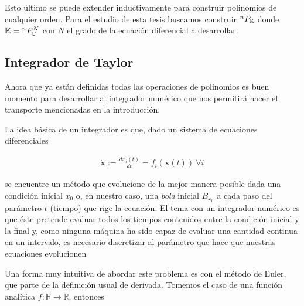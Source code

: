 Esto último se puede extender inductivamente para construir polinomios de cualquier orden. Para el estudio de esta tesis buscamos construir ${^{n}P_{\mathbb{K}}}$ donde $\mathbb{K} = {^{n}P_{\mathbb{C}}^ N }$ con $N$ el grado de la ecuación diferencial a desarrollar.





\subsection{Integrador de Taylor}


Ahora que ya están definidas todas las operaciones de polinomios es buen momento para desarrollar al integrador numérico que nos permitirá hacer el transporte mencionadas en la introducción.

La idea básica de un integrador es que, dado un sistema de ecuaciones diferenciales

\begin{align}
 \dot{\textbf{x}} := \frac{dx_i(t)}{dt} = f_i(\textbf{x}(t)) \ \forall i
 \label{eq: eqdif}
\end{align}

se encuentre un método que evolucione de la mejor manera posible dada una condición inicial $x_0$ o, en nuestro caso, una \textit{bola} inicial $B_{x_0}$ a cada paso del parámetro $t$ (tiempo) que rige la ecuación. El tema con un integrador numérico es que éste pretende evaluar todos los tiempos contenidos entre la condición inicial y la final y, como ninguna máquina ha sido capaz de evaluar una cantidad continua en un intervalo, es necesario discretizar al parámetro que hace que nuestras ecuaciones evolucionen

Una forma muy intuitiva de abordar este problema es con el método de Euler, que parte de la definición usual de derivada. Tomemos el caso de una función analítica $f: \mathbb{R}  \to \mathbb{R}$, entonces

